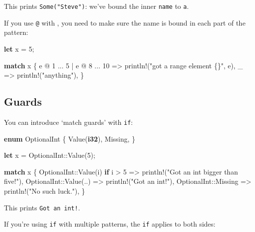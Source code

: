 \documentclass[a4paper,]{book}
\newenvironment{Shaded}{\begin{snugshade}}{\end{snugshade}}
\newcommand{\KeywordTok}[1]{\textcolor[rgb]{0.13,0.29,0.53}{\textbf{{#1}}}}
\newcommand{\DecValTok}[1]{\textcolor[rgb]{0.00,0.00,0.81}{{#1}}}
\newcommand{\StringTok}[1]{\textcolor[rgb]{0.31,0.60,0.02}{{#1}}}
\newcommand{\OtherTok}[1]{\textcolor[rgb]{0.56,0.35,0.01}{{#1}}}
\newcommand{\NormalTok}[1]{{#1}}
\begin{document}
This prints \texttt{Some("Steve")}: we've bound the inner \texttt{name}
to \texttt{a}.

If you use \texttt{@} with \texttt{\textbar{}}, you need to make sure
the name is bound in each part of the pattern:

\begin{Shaded}
\begin{Highlighting}[]
\KeywordTok{let} \NormalTok{x = }\DecValTok{5}\NormalTok{;}

\KeywordTok{match} \NormalTok{x \{}
    \NormalTok{e @ }\DecValTok{1} \NormalTok{... }\DecValTok{5} \NormalTok{| e @ }\DecValTok{8} \NormalTok{... }\DecValTok{10} \NormalTok{=> }\OtherTok{println!}\NormalTok{(}\StringTok{"got a range element \{\}"}\NormalTok{, e),}
    \NormalTok{_ => }\OtherTok{println!}\NormalTok{(}\StringTok{"anything"}\NormalTok{),}
\NormalTok{\}}
\end{Highlighting}
\end{Shaded}

\subsection{Guards}\label{guards}

You can introduce `match guards' with \texttt{if}:

\begin{Shaded}
\begin{Highlighting}[]
\KeywordTok{enum} \NormalTok{OptionalInt \{}
    \NormalTok{Value(}\KeywordTok{i32}\NormalTok{),}
    \NormalTok{Missing,}
\NormalTok{\}}

\KeywordTok{let} \NormalTok{x = OptionalInt::Value(}\DecValTok{5}\NormalTok{);}

\KeywordTok{match} \NormalTok{x \{}
    \NormalTok{OptionalInt::Value(i) }\KeywordTok{if} \NormalTok{i > }\DecValTok{5} \NormalTok{=> }\OtherTok{println!}\NormalTok{(}\StringTok{"Got an int bigger than five!"}\NormalTok{),}
    \NormalTok{OptionalInt::Value(..) => }\OtherTok{println!}\NormalTok{(}\StringTok{"Got an int!"}\NormalTok{),}
    \NormalTok{OptionalInt::Missing => }\OtherTok{println!}\NormalTok{(}\StringTok{"No such luck."}\NormalTok{),}
\NormalTok{\}}
\end{Highlighting}
\end{Shaded}

This prints \texttt{Got\ an\ int!}.

If you're using \texttt{if} with multiple patterns, the \texttt{if}
applies to both sides:
\end{document}
